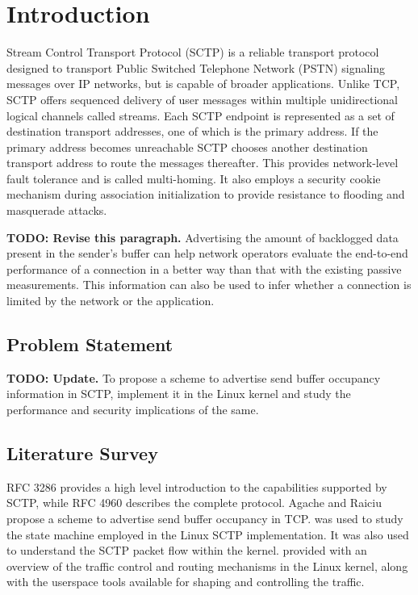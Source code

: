 \chapter{Introduction}
Stream Control Transport Protocol (SCTP) is a reliable transport protocol
designed to transport Public Switched Telephone Network (PSTN) signaling
messages over IP networks, but is capable of broader applications.
Unlike TCP, SCTP offers sequenced delivery of user messages within multiple
unidirectional logical channels called streams.
Each SCTP endpoint is represented as a set of destination transport addresses,
one of which is the primary address. If the primary address becomes unreachable
SCTP chooses another destination transport address to route the messages
thereafter. This provides network-level fault tolerance and is called
multi-homing.
It also employs a security cookie mechanism during association initialization
to provide resistance to flooding and masquerade attacks.

\textbf{TODO: Revise this paragraph.}
Advertising the amount of backlogged data present in the sender's buffer can
help network operators evaluate the end-to-end performance of a connection
in a better way than that with the existing passive measurements.
This information can also be used to infer whether a connection is limited
by the network or the application.

\section{Problem Statement}
\textbf{TODO: Update.}
To propose a scheme to advertise send buffer occupancy information in SCTP,
implement it in the Linux kernel and study the performance and security
implications of the same.

\section{Literature Survey}
RFC 3286 \cite{rfc3286} provides a high level introduction to the capabilities
supported by SCTP, while RFC 4960 \cite{rfc4960} describes the complete
protocol. Agache and Raiciu \cite{tcp-sndbufadv} propose a scheme to advertise
send buffer occupancy in TCP. \cite{budigerelinux} was used to study the state
machine employed in the Linux SCTP implementation. It was also used to
understand the SCTP packet flow within the kernel. \cite{lartc} provided with
an overview of the traffic control and routing mechanisms in the Linux kernel,
along with the userspace tools available for shaping and controlling the
traffic.
